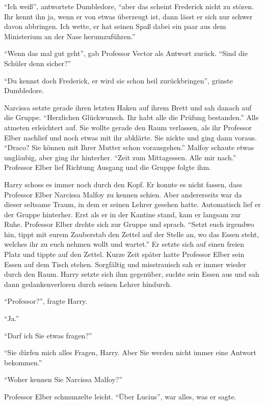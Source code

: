 \enquote{Ich weiß}, antwortete Dumbledore, \enquote{aber das scheint Frederick nicht zu stören. Ihr kennt ihn ja, wenn er von etwas überzeugt ist, dann lässt er sich nur schwer davon abbringen. Ich wette, er hat seinen Spaß dabei ein paar aus dem Ministerium an der Nase herumzuführen.}

\enquote{Wenn das mal gut geht}, gab Professor Vector als Antwort zurück. \enquote{Sind die Schüler denn sicher?}

\enquote{Du kennst doch Frederick, er wird sie schon heil zurückbringen}, grinste Dumbledore.

Narcissa setzte gerade ihren letzten Haken auf ihrem Brett und sah danach auf die Gruppe. \enquote{Herzlichen Glückwunsch. Ihr habt alle die Prüfung bestanden.} Alle atmeten erleichtert auf. Sie wollte gerade den Raum verlassen, als ihr Professor Elber nachlief und noch etwas mit ihr abklärte. Sie nickte und ging dann voraus. \enquote{Draco? Sie können mit Ihrer Mutter schon vorausgehen.} Malfoy schaute etwas ungläubig, aber ging ihr hinterher. \enquote{Zeit zum Mittagessen. Alle mir nach.} Professor Elber lief Richtung Ausgang und die Gruppe folgte ihm.

Harry schoss es immer noch durch den Kopf. Er konnte es nicht fassen, dass Professor Elber Narcissa Malfoy zu kennen schien. Aber andererseits war da dieser seltsame Traum, in dem er seinen Lehrer gesehen hatte. Automatisch lief er der Gruppe hinterher. Erst als er in der Kantine stand, kam er langsam zur Ruhe. Professor Elber drehte sich zur Gruppe und sprach. \enquote{Setzt euch irgendwo hin, tippt mit eurem Zauberstab den Zettel auf der Stelle an, wo das Essen steht, welches ihr zu euch nehmen wollt und wartet.} Er setzte sich auf einen freien Platz und tippte auf den Zettel. Kurze Zeit später hatte Professor Elber sein Essen auf dem Tisch stehen. Sorgfältig und misstrauisch sah er immer wieder durch den Raum. Harry setzte sich ihm gegenüber, suchte sein Essen aus und sah dann gedankenverloren durch seinen Lehrer hindurch.

\enquote{Professor?}, fragte Harry.

\enquote{Ja.}

\enquote{Darf ich Sie etwas fragen?}

\enquote{Sie dürfen mich alles Fragen, Harry. Aber Sie werden nicht immer eine Antwort bekommen.}

\enquote{Woher kennen Sie Narcissa Malfoy?}

Professor Elber schmunzelte leicht. \enquote{Über Lucius}, war alles, was er sagte.

